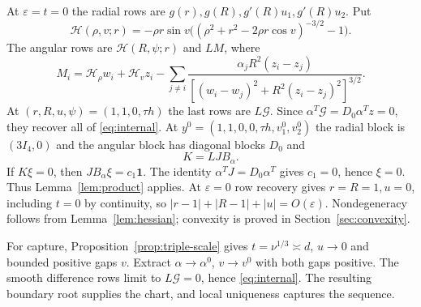 \documentclass[11pt,a4paper]{article}
\numberwithin{equation}{section}
\theoremstyle{remark}
\newcommand{\eps}{\varepsilon}
\newcommand{\one}{\boldsymbol{1}}
\begin{document}
At $\eps=t=0$ the radial rows are $g(r),g(R),g'(R)u_1,g'(R)u_2$. Put
\begin{equation}\label{eq:Hzero}
 \mathcal H(\rho,v;r)=-\rho r\sin v
 \bigl((\rho^2+r^2-2\rho r\cos v)^{-3/2}-1\bigr).
\end{equation}
The angular rows are $\mathcal H(R,\psi;r)$ and $LM$, where
\[
 M_i=\mathcal H_\rho w_i+\mathcal H_vz_i-
 \sum_{j\ne i}\frac{\alpha_jR^2(z_i-z_j)}{[(w_i-w_j)^2+R^2(z_i-z_j)^2]^{3/2}}.
\]
At $(r,R,u,\psi)=(1,1,0,\tau h)$ the last rows are $L\mathcal G$. Since $\alpha^T\mathcal G=D_0\alpha^Tz=0$, they recover all of \eqref{eq:internal}. At $y^0=(1,1,0,0,\tau h,v_1^0,v_2^0)$ the radial block is $(3I_4,0)$ and the angular block has diagonal blocks $D_0$ and
\begin{equation}\label{eq:Kreg}
 K=LJB_\alpha.
\end{equation}
If $K\xi=0$, then $JB_\alpha\xi=c_1\one$. The identity $\alpha^TJ=D_0\alpha^T$ gives $c_1=0$, hence $\xi=0$. Thus Lemma~\ref{lem:product} applies. At $\eps=0$ row recovery gives $r=R=1,u=0$, including $t=0$ by continuity, so $|r-1|+|R-1|+|u|=O(\eps)$. Nondegeneracy follows from Lemma~\ref{lem:hessian}; convexity is proved in Section~\ref{sec:convexity}.

For capture, Proposition~\ref{prop:triple-scale} gives $t=\nu^{1/3}\asymp d$, $u\to0$ and bounded positive gaps $v$. Extract $\alpha\to\alpha^0$, $v\to v^0$ with both gaps positive. The smooth difference rows limit to $L\mathcal G=0$, hence \eqref{eq:internal}. The resulting boundary root supplies the chart, and local uniqueness captures the sequence.
\end{document}
